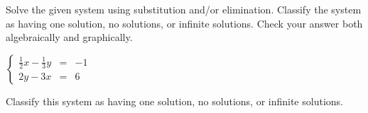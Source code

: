 \documentclass{ximera}
\author{Elizabeth Miller}
\begin{document}
\licenseSZ

Solve the given system using substitution and/or elimination. Classify the system as having one solution, no solutions, or infinite solutions. Check your answer both algebraically and graphically.

$\left\{ \begin{array}{rcr} \frac{1}{2}x-\frac{1}{3}y & = & -1  \\ [5pt] 2y-3x & = & 6 \end{array} \right.$ 

\begin{exercise}
Classify this system as having one solution, no solutions, or infinite solutions.
\begin{multipleChoice}  
\end{multipleChoice}  
\end{exercise}
\end{document}
